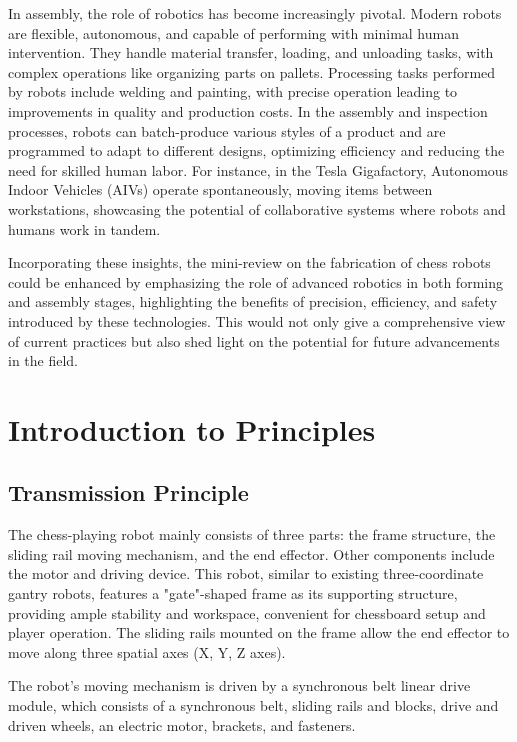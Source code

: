 \documentclass[10pt, a4paper, twocolumn]{article}
\begin{document}
In assembly, the role of robotics has become increasingly pivotal. Modern robots are flexible, autonomous, and capable of performing with minimal human intervention. They handle material transfer, loading, and unloading tasks, with complex operations like organizing parts on pallets. Processing tasks performed by robots include welding and painting, with precise operation leading to improvements in quality and production costs. In the assembly and inspection processes, robots can batch-produce various styles of a product and are programmed to adapt to different designs, optimizing efficiency and reducing the need for skilled human labor. For instance, in the Tesla Gigafactory, Autonomous Indoor Vehicles (AIVs) operate spontaneously, moving items between workstations, showcasing the potential of collaborative systems where robots and humans work in tandem\cite{RobotsNet2019}.

Incorporating these insights, the mini-review on the fabrication of chess robots could be enhanced by emphasizing the role of advanced robotics in both forming and assembly stages, highlighting the benefits of precision, efficiency, and safety introduced by these technologies. This would not only give a comprehensive view of current practices but also shed light on the potential for future advancements in the field.

\section{Introduction to Principles}
\subsection{Transmission Principle}
The chess-playing robot mainly consists of three parts: the frame structure, the sliding rail moving mechanism, and the end effector. Other components include the motor and driving device. This robot, similar to existing three-coordinate gantry robots, features a "gate"-shaped frame as its supporting structure, providing ample stability and workspace, convenient for chessboard setup and player operation. The sliding rails mounted on the frame allow the end effector to move along three spatial axes (X, Y, Z axes).

The robot's moving mechanism is driven by a synchronous belt linear drive module, which consists of a synchronous belt, sliding rails and blocks, drive and driven wheels, an electric motor, brackets, and fasteners.
\end{document}
